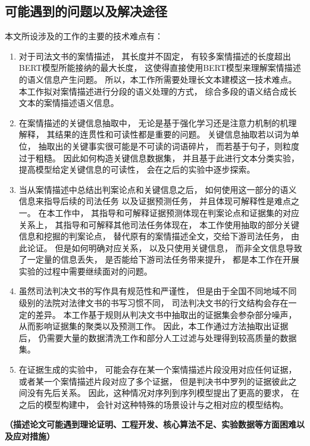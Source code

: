 \subsection{可能遇到的问题以及解决途径}
本文所设涉及的工作的主要的技术难点有：
\begin{enumerate}
    \item 
    对于司法文书的案情描述，
    其长度并不固定，
    有较多案情描述的长度超出BERT模型所能接纳的最大长度，
    这使得直接使用BERT模型来理解案情描述的语义信息产生问题。
    所以，本工作所需要处理长文本建模这一技术难点。
    本工作拟对案情描述进行分段的语义处理的方式，
    综合多段的语义结合成长文本的案情描述语义信息。

    \item 
    在案情描述的关键信息抽取中，
    无论是基于强化学习还是注意力机制的机理解释，
    其结果的连贯性和可读性都是重要的问题。
    关键信息抽取若以词为单位，
    抽取出的关键事实很可能是不可读的词语碎片，
    而若基于句子，则粒度过于粗糙。
    因此如何构造关键信息数据集，
    并且基于此进行文本分类实验，
    提高模型给定关键信息的可读性，
    会在之后的实验中逐步探索。

    \item 
    当从案情描述中总结出判案论点和关键信息之后，
    如何使用这一部分的语义信息来指导后续的司法任务
    以及证据预测任务，
    并且体现可解释性是难点之一。
    在本工作中，
    其指导和可解释证据预测体现在判案论点和证据集的对应关系上，
    其指导和可解释其他司法任务体现在，
    本工作使用抽取的部分关键信息和挖掘的判案论点，
    替代原有的案情描述全文，交给下游司法任务，
    由此论证。
    但是如何明确对应关系，
    以及只使用关键信息，
    而非全文信息导致了一定量的信息丢失，
    是否能给下游司法任务带来提升，
    都是本工作在开展实验的过程中需要继续面对的问题。

    \item 
    虽然司法判决文书的写作具有规范性和严谨性，
    但是由于全国不同地域不同级别的法院对法律文书的书写习惯不同，
    司法判决文书的行文结构会存在一定的差异。
    本工作基于规则从判决文书中抽取出的证据集会参杂部分噪声，
    从而影响证据集的聚类以及预测工作。
    因此，本工作通过方法抽取出证据后，
    仍需要大量的数据清洗工作和部分人工过滤与处理得到较高质量的数据集。

    \item 
    在证据生成的实验中，
    可能会存在某一个案情描述片段没用对应任何证据，
    或者某一个案情描述片段对应了多个证据，
    但是判决书中罗列的证据彼此之间没有先后关系。
    因此，这种情况对序列到序列模型提出了更高的要求，
    在之后的模型构建中，
    会针对这种特殊的场景设计与之相对应的模型结构。


\end{enumerate}

\textbf{\color{red}
（描述论文可能遇到理论证明、工程开发、核心算法不足、实验数据等方面困难以及应对措施）}